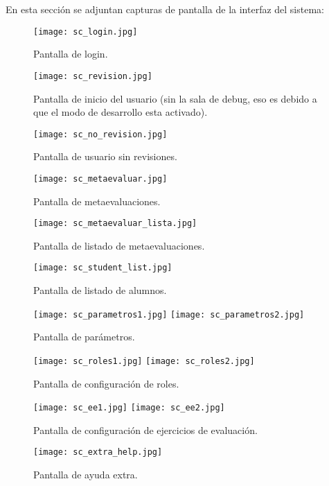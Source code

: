 En esta sección se adjuntan capturas de pantalla de la interfaz del sistema:
\newline

\begin{figure}[h!]
	\centering
	\texttt{[image: sc\_login.jpg]}
	\caption{Pantalla de login.}
\end{figure}

\begin{figure}
	\centering
	\texttt{[image: sc\_revision.jpg]}
	\caption{Pantalla de inicio del usuario (sin la sala de debug, eso es debido a que el modo de desarrollo esta activado).}
\end{figure}

\begin{figure}
	\centering
	\texttt{[image: sc\_no\_revision.jpg]}
	\caption{Pantalla de usuario sin revisiones.}
\end{figure}

\begin{figure}
	\centering
	\texttt{[image: sc\_metaevaluar.jpg]}
	\caption{Pantalla de metaevaluaciones.}
\end{figure}

\begin{figure}
	\centering
	\texttt{[image: sc\_metaevaluar\_lista.jpg]}
	\caption{Pantalla de listado de metaevaluaciones.}
\end{figure}

\begin{figure}
	\centering
	\texttt{[image: sc\_student\_list.jpg]}
	\caption{Pantalla de listado de alumnos.}
\end{figure}

\begin{figure}
	\centering
	\texttt{[image: sc\_parametros1.jpg]}
	\texttt{[image: sc\_parametros2.jpg]}
	\caption{Pantalla de parámetros.}
\end{figure}

\begin{figure}
	\centering
	\texttt{[image: sc\_roles1.jpg]}
	\texttt{[image: sc\_roles2.jpg]}
	\caption{Pantalla de configuración de roles.}
\end{figure}

\begin{figure}
	\centering
	\texttt{[image: sc\_ee1.jpg]}
	\texttt{[image: sc\_ee2.jpg]}
	\caption{Pantalla de configuración de ejercicios de evaluación.}
\end{figure}

\begin{figure}
	\centering
	\texttt{[image: sc\_extra\_help.jpg]}
	\caption{Pantalla de ayuda extra.}
\end{figure}